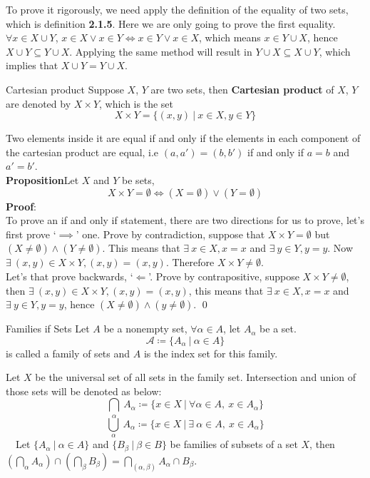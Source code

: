 \documentclass{article}
\begin{document}
To prove it rigorously, we need apply the definition of the equality of two sets, which is definition \textbf{2.1.5}.
Here we are only going to prove the first equality. $\forall x \in X \cup Y$, $x \in X \lor x \in Y \iff x \in Y \lor x \in X$, which means $x \in Y \cup X$, hence $X \cup Y \subseteq Y \cup X$. Applying the same method will result in $Y \cup X \subseteq X \cup Y$,
which implies that $X \cup Y = Y \cup X$.
\begin{defin}{Cartesian product}
    Suppose $X$, $Y$ are two sets, then \textbf{Cartesian product} of $X$, $Y$ are denoted by $X \times Y$,
    which is the set
    $$
    X \times Y = \{(x, y)\ |\ x\in X, y \in Y\}
    $$
\end{defin}
Two elements inside it are equal if and only if the elements in each component of the cartesian product are equal, i.e   $(a,a') = (b,b')$ if and only if $a = b$ and $a' = b'$.\\
\textbf{Proposition}\quad Let $X$ and $Y$ be sets,
$$X \times Y = \emptyset \iff (X = \emptyset) \lor (Y = \emptyset)$$
\textbf{Proof}:\\
To prove an if and only if statement, there are two directions for us to prove, let's first prove `$\implies$' one. Prove by contradiction,
suppose that $X \times Y = \emptyset$ but $(X \neq \emptyset) \land (Y \neq \emptyset)$. This means that $\exists\ x \in X, x = x$ and $\exists\ y \in Y, y = y$.
Now $\exists\ (x,y) \in X \times Y, (x, y) = (x, y)$. Therefore $X \times Y \neq \emptyset$.\\
Let's that prove backwards, `$\Longleftarrow$'. Prove by contrapositive, suppose $X \times Y \neq \emptyset$, then $\exists\ (x,y) \in X \times Y, (x, y) = (x, y)$, this means
that $\exists\ x \in X, x = x$ and $\exists\ y \in Y, y = y$, hence $(X \neq \emptyset) \land (y \neq \emptyset)$. \qed
\begin{defin}{Families if Sets}
    Let $A$ be a nonempty set, $\forall \alpha \in A$, let $A_{\alpha}$ be a set.
    $$
    \mathcal{A} \coloneqq \{A_{\alpha}\ |\ \alpha \in A \}
    $$
    is called a family of sets and $A$ is the index set for this family.
\end{defin}
Let $X$ be the universal set of all sets in the family set. Intersection and union of those sets will be denoted as below:
$$
\underset{\alpha}\bigcap\ A_{\alpha} \coloneqq \{x \in X \ |\ \forall \alpha \in A,\ x \in A_{\alpha} \}
$$
$$
\underset{\alpha}\bigcup\ A_{\alpha} \coloneqq \{x \in X\ |\ \exists\ \alpha \in A,\ x \in A_{\alpha}\}
$$
\quad\ \  Let $\{A_{\alpha}\ |\ \alpha \in A\}$ and $\{B_{\beta}\ |\ \beta \in B\}$ be families of subsets of a set $X$, then $ (\bigcap_{\alpha}A_{\alpha}) \cap ( \bigcap_{\beta} B_{\beta}) = \bigcap_{(\alpha, \beta)} A_{\alpha} \cap B_{\beta}$.\\
\end{document}
